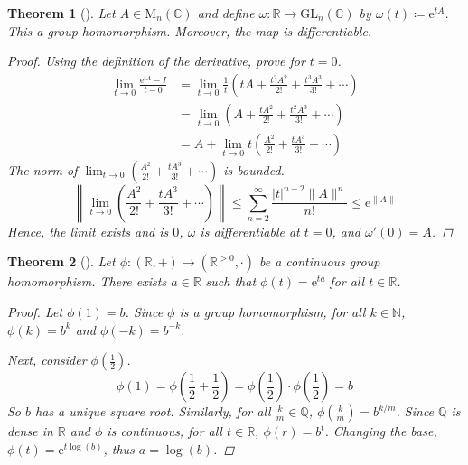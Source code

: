 \documentclass[letterpaper, 10pt]{article}
\theoremstyle{theostyle}
\newtheorem{theorem}{Theorem}[section]
\newenvironment{thmstyle}[1][]{%
    \begin{theorem}[#1]\leavevmode\vspace{-\baselineskip}\myquote%
    }{\endmyquote\end{theorem}}
\begin{document}
\begin{thmstyle}
    Let \(A \in \mathrm{M}_n (\mathbb{C})\) and define \(\omega : \mathbb{R} \rightarrow \mathrm{GL}_n (\mathbb{C})\) by \(\omega(t) \coloneqq \mathrm{e}^{tA}\).
    This a group homomorphism.
    Moreover, the map is differentiable.

    \begin{proof}
        Using the definition of the derivative, prove for \(t = 0\).
        \begin{align*}
            \lim_{t \to 0} \frac{\mathrm{e}^{tA} - I}{t - 0} &= \lim_{t \to 0} \frac{1}{t} \left(tA + \frac{t^2 A^2}{2!} + \frac{t^3 A^3}{3!} + \cdots \right) \\
            &= \lim_{t \to 0} \left(A + \frac{t A^2}{2!} + \frac{t^2 A^3}{3!} + \cdots \right) \\
            &= A + \lim_{t \to 0} t\left(\frac{A^2}{2!} + \frac{t A^3}{3!} + \cdots \right)
        \end{align*}
        The norm of \(\displaystyle \lim_{t \to 0} \left(\frac{A^2}{2!} + \frac{t A^3}{3!} + \cdots \right)\) is bounded.
        \[\left\lVert \lim_{t \to 0} \left(\frac{A^2}{2!} + \frac{t A^3}{3!} + \cdots \right) \right\rVert \leq \sum_{n=2}^\infty \frac{\lvert t \rvert^{n-2} \lVert A \rVert^n}{n!} \leq \mathrm{e}^{\lVert A \rVert}\]
        Hence, the limit exists and is \(0\), \(\omega\) is differentiable at \(t = 0\), and \(\omega ' (0) = A\).
    \end{proof}
\end{thmstyle}

\begin{thmstyle}
    Let \(\phi: (\mathbb{R}, +) \rightarrow (\mathbb{R}^{>0}, \cdot) \) be a continuous group homomorphism.
    There exists \(a \in \mathbb{R}\) such that \(\phi(t) = \mathrm{e}^{ta}\) for all \(t \in \mathbb{R}\).

    \begin{proof}
        Let \(\phi(1) = b\).
        Since \(\phi\) is a group homomorphism, for all \(k \in \mathbb{N}\), \(\phi(k) = b^k\) and \(\phi(-k) = b^{-k}\).
        
        Next, consider \(\phi\left(\frac{1}{2}\right)\).
        \[\phi(1) = \phi\left(\frac{1}{2} + \frac{1}{2}\right) = \phi\left(\frac{1}{2}\right) \cdot \phi\left(\frac{1}{2}\right) = b\]
        So \(b\) has a unique square root.
        Similarly, for all \(\frac{k}{m} \in \mathbb{Q}\), \(\phi\left(\frac{k}{m}\right) = b^{k/m}\).
        Since \(\mathbb{Q}\) is dense in \(\mathbb{R}\) and \(\phi\) is continuous, for all \(t \in \mathbb{R}\), \(\phi(r) = b^t\).
        Changing the base, \(\phi (t) = \mathrm{e}^{t \log(b)}\), thus \(a  = \log (b)\).
    \end{proof}
\end{thmstyle}
\end{document}
